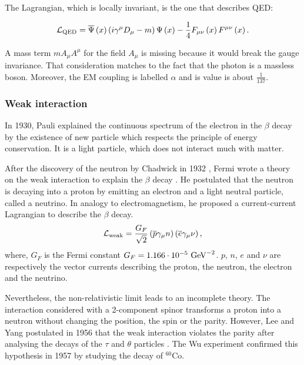       The Lagrangian, which is locally invariant, is the one that describes \gls{QED}:

      \begin{equation}
          \mathcal{L}_{\rm{QED}} =  \overline{\Psi}\left(x\right)\left( i \gamma^\mu D_\mu - m \right) \Psi\left(x\right) - \frac{1}{4}F_{\mu \nu}\left(x\right) F^{\mu \nu}\left(x\right).
      \end{equation}

      A mass term $m A_{\mu} A^{\mu}$ for the field $A_{\mu}$ is missing because it would break the gauge invariance.
      That consideration matches to the fact that the photon is a massless boson.
      Moreover, the \gls{EM} coupling is labelled $\alpha$ and is value is about $\frac{1}{137}$.

    \subsubsection{Weak interaction}

    In 1930, Pauli explained the continuous spectrum of the electron in the $\beta$ decay by the existence of new particle which respects the principle of energy conservation.
    It is a light particle, which does not interact much with matter.

    After the discovery of the neutron by Chadwick in 1932 \cite{chadwick1932possible}, Fermi wrote a theory on the weak interaction to explain the $\beta$ decay \cite{Fermi:1934hr}. 
    He postulated that the neutron is decaying into a proton by emitting an electron and a light neutral particle, called a neutrino.
    In analogy to electromagnetism, he proposed a current-current Lagrangian to describe the $\beta$ decay.
    \begin{equation}
      \mathcal{L}_{\rm{weak}} = \frac{G_F}{\sqrt{2}}\left(\overline{p} \gamma_{\mu} n \right) \left(\overline{e} \gamma_{\mu} \nu \right),
    \end{equation}
    where, $G_F$ is the Fermi constant $G_F = 1.166 \cdot 10^{-5}~\rm{GeV}^{-2}$. $p$, $n$, $e$ and $\nu$ are respectively the vector currents describing the proton, the neutron, the electron and the neutrino. 
    
    Nevertheless, the non-relativistic limit leads to an incomplete theory.
    The interaction considered with a 2-component spinor transforms a proton into a neutron without changing the position, the spin or the parity.
    However, Lee and Yang postulated in 1956 that the weak interaction violates the parity after analysing the decays of the $\tau$ and $\theta$ particles \cite{1956PhRv..104..254L}.
    The Wu experiment \cite{1957PhRv..105.1413W} confirmed this hypothesis in 1957 by studying the decay of $^{60}$Co.


